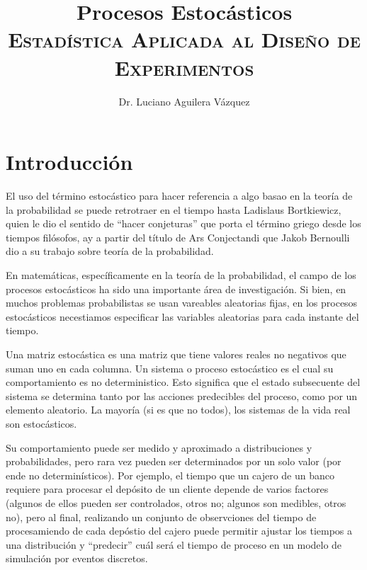 \documentclass[11 pts, letterpaper, twosided]{article}
\title{Procesos Estocásticos\\
      {\normalsize \textsc{Estadística Aplicada al Diseño de Experimentos}}}
\author{Dr. Luciano Aguilera Vázquez}
\begin{document}
\maketitle

\section{Introducción}

El uso del término estocástico para hacer referencia a algo basao en
la teoría de la probabilidad se puede retrotraer en el tiempo hasta
Ladislaus Bortkiewicz, quien le dio el sentido de ``hacer conjeturas''
que porta el término griego desde los tiempos filósofos, ay a partir
del título de Ars Conjectandi que Jakob Bernoulli dio a su trabajo
sobre teoría de la probabilidad.

En matemáticas, específicamente en la teoría de la probabilidad, el
campo de los procesos estocásticos ha sido una importante área de
investigación. Si bien, en muchos problemas probabilistas se usan
vareables aleatorias fijas, en los procesos estocásticos necestiamos
especificar las variables aleatorias para cada instante del tiempo.

Una matriz estocástica es una matriz que tiene valores reales no
negativos que suman uno en cada columna. Un sistema o proceso
estocástico es el cual su comportamiento es no deterministico. Esto
significa que el estado subsecuente del sistema se determina tanto por
las acciones predecibles del proceso, como por un elemento
aleatorio. La mayoría (si es que no todos), los sistemas de la vida
real son estocásticos.

Su comportamiento puede ser medido y aproximado a distribuciones y
probabilidades, pero rara vez pueden ser determinados por un solo
valor (por ende no determinísticos). Por ejemplo, el tiempo que un
cajero de un banco requiere para procesar el depósito de un cliente
depende de varios factores (algunos de ellos pueden ser controlados,
otros no; algunos son medibles, otros no), pero al final, realizando
un conjunto de observciones del tiempo de procesamiendo de cada
depóstio del cajero puede permitir ajustar los tiempos a una
distribución y ``predecir'' cuál será el tiempo de proceso en un
modelo de simulación por eventos discretos.
\end{document}
